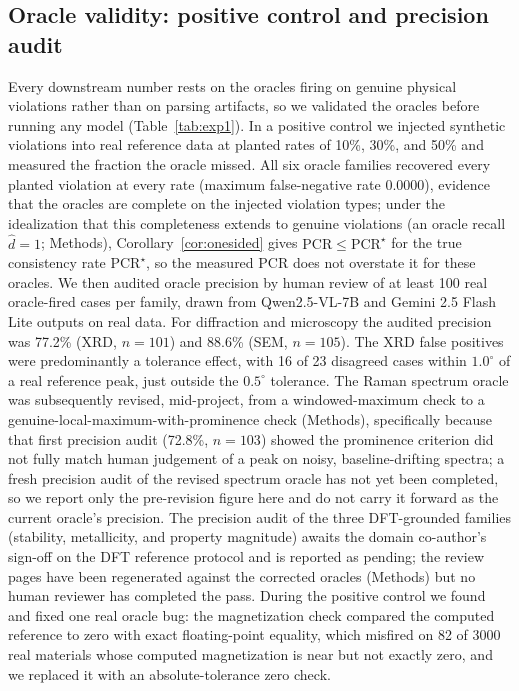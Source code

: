 \documentclass[pdflatex,sn-nature]{sn-jnl}
\begin{document}
\subsection*{Oracle validity: positive control and precision audit}
Every downstream number rests on the oracles firing on genuine physical violations
rather than on parsing artifacts, so we validated the oracles before running any model
(Table~\ref{tab:exp1}). In a positive control we injected synthetic violations into real
reference data at planted rates of 10\%, 30\%, and 50\% and measured the fraction the
oracle missed. All six oracle families recovered every planted violation at every rate
(maximum false-negative rate 0.0000), evidence that the oracles are complete on the
injected violation types; under the idealization that this completeness extends to
genuine violations (an oracle recall $\hat d=1$; Methods), Corollary~\ref{cor:onesided}
gives $\mathrm{PCR}\le\mathrm{PCR}^\star$ for the true consistency rate
$\mathrm{PCR}^\star$, so the measured PCR does not overstate it for these oracles. We then audited oracle precision by human review of
at least 100 real oracle-fired cases per family, drawn from Qwen2.5-VL-7B and Gemini 2.5
Flash Lite outputs on real data. For diffraction and microscopy the audited precision
was 77.2\% (XRD, $n=101$) and 88.6\% (SEM, $n=105$). The XRD
false positives were predominantly a tolerance effect, with 16 of 23 disagreed cases
within $1.0^\circ$ of a real reference peak, just outside the $0.5^\circ$ tolerance. The Raman
spectrum oracle was subsequently revised, mid-project, from a windowed-maximum check to a
genuine-local-maximum-with-prominence check (Methods), specifically because that first
precision audit (72.8\%, $n=103$) showed the prominence criterion did not fully match human
judgement of a peak on noisy, baseline-drifting spectra; a fresh precision audit of the
revised spectrum oracle has not yet been completed, so we report only the pre-revision figure
here and do not carry it forward as the current oracle's precision. The precision audit of the three DFT-grounded families (stability,
metallicity, and property magnitude) awaits the domain co-author's sign-off on the
DFT reference protocol and is reported as pending; the review pages have been regenerated
against the corrected oracles (Methods) but no human reviewer has completed the pass. During the positive control we found
and fixed one real oracle bug: the magnetization check compared the computed reference to
zero with exact floating-point equality, which misfired on 82 of 3000 real materials
whose computed magnetization is near but not exactly zero, and we replaced it with an
absolute-tolerance zero check.
\end{document}
